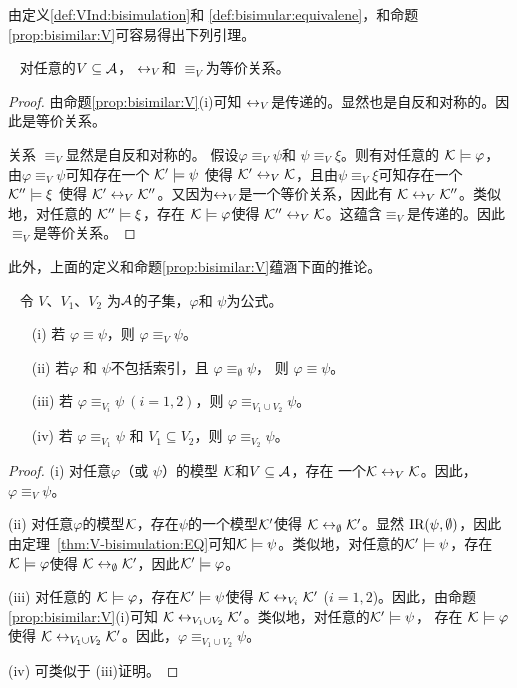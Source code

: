 由定义\ref{def:VInd:bisimulation}和 \ref{def:bisimular:equivalene}，和命题\ref{prop:bisimilar:V}可容易得出下列引理。
\begin{lemma}~\label{lem:eqR}
	对任意的$V\subseteq\cal A$，  $\leftrightarrow_V$和 $\equiv_V$为等价关系。
\end{lemma}
\begin{proof}
	由命题\ref{prop:bisimilar:V}(i)可知 $\leftrightarrow_V$是传递的。显然也是自反和对称的。因此是等价关系。
	
	关系 $\equiv_V$显然是自反和对称的。
	假设$\varphi\equiv_V\psi$和 $\psi\equiv_V\xi$。则有对任意的 ${\cal K}\models\varphi$，由$\varphi\equiv_V\psi$可知存在一个 ${\cal K}'\models\psi$ \hbox{使得} ${\cal K}'\leftrightarrow_V{\cal K}$，且由$\psi\equiv_V\xi$可知存在一个 ${\cal K}''\models\xi$ \hbox{使得}
	${\cal K}'\leftrightarrow_V{\cal K}''$。又因为$\leftrightarrow_V$是一个等价关系，因此有
	${\cal K}\leftrightarrow_V{\cal K}''$。类似地，对任意的 ${\cal K}''\models\xi$，存在 ${\cal K}\models \varphi$\hbox{使得} ${\cal K}''\leftrightarrow_V{\cal K}$。这蕴含$\equiv_V$是传递的。因此$\equiv_V$是等价关系。
\end{proof} 

此外，上面的定义和命题\ref{prop:bisimilar:V}蕴涵下面的推论。
\begin{corollary}~\label{cor:eqbi}
	令 $V$、$V_1$、$V_2$ 为$\cal A$的子集，$\varphi$和 $\psi$为公式。
	\begin{itemize}
		\item[(i)] 若 $\varphi\equiv\psi$，则 $\varphi\equiv_V\psi$。
		\item[(ii)] 若$\varphi$ 和 $\psi$不包括索引，且 $\varphi\equiv_\emptyset\psi$， 则 $\varphi\equiv\psi$。
		\item[(iii)] 若 $\varphi\equiv_{V_i}\psi~(i=1,2)$，则 $\varphi\equiv_{V_1\cup V_2}\psi$。
		\item[(iv)] 若 $\varphi\equiv_{V_1}\psi$ 和 $V_1\subseteq V_2$，则 $\varphi\equiv_{V_2}\psi$。
	\end{itemize}
\end{corollary}
\begin{proof}
	(i) 对任意$\varphi$（或 $\psi$）的模型 ${\cal K}$和$V \subseteq {\cal A}$，存在 一个${\cal K} \leftrightarrow_V {\cal K}$。因此， $\varphi\equiv_V\psi$。
	
	(ii) 对任意$\varphi$的模型${\cal K}$，存在$\psi$的一个模型${\cal K}'$使得 ${\cal K} \leftrightarrow_{\emptyset} {\cal K}'$。显然 $\textrm{IR}(\psi, \emptyset)$，因此由定理~\ref{thm:V-bisimulation:EQ}可知${\cal K} \models \psi$。类似地，对任意的${\cal K}' \models \psi$，存在 ${\cal K} \models \varphi$使得 ${\cal K} \leftrightarrow_{\emptyset} {\cal K}'$，因此${\cal K}'\models \varphi$。
	
	(iii) 对任意的 ${\cal K} \models \varphi$，存在${\cal K}' \models \psi$使得 ${\cal K} \leftrightarrow_{V_i} {\cal K}'$ ($i=1,2$)。因此，由命题\ref{prop:bisimilar:V}(i)可知 ${\cal K} \leftrightarrow_{V_1\cup V_2} {\cal K}'$。类似地，对任意的${\cal K}' \models \psi$， 存在 ${\cal K} \models \varphi$使得 ${\cal K} \leftrightarrow_{V_1\cup V_2} {\cal K}'$。因此，$\varphi\equiv_{V_1\cup V_2}\psi$。
	
	(iv) 可类似于 (iii)证明。
\end{proof}

